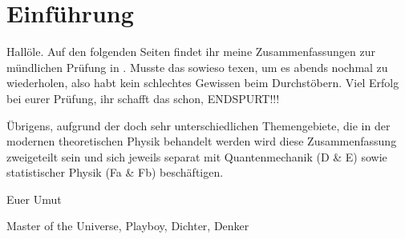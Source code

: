 \chapter{Einführung}
Hallöle.
Auf den folgenden Seiten findet ihr meine Zusammenfassungen zur mündlichen Prüfung in \whichprep.
Musste das sowieso texen, um es abends nochmal zu wiederholen, also habt kein schlechtes Gewissen beim Durchstöbern.
Viel Erfolg bei eurer Prüfung, ihr schafft das schon, ENDSPURT!!!

Übrigens, aufgrund der doch sehr unterschiedlichen Themengebiete, die in der modernen theoretischen Physik behandelt werden
wird diese Zusammenfassung zweigeteilt sein und sich jeweils separat mit Quantenmechanik (\whichprep D & E) sowie statistischer Physik (\whichprep Fa & Fb) beschäftigen.

Euer Umut
\par
Master of the Universe, Playboy, Dichter, Denker
